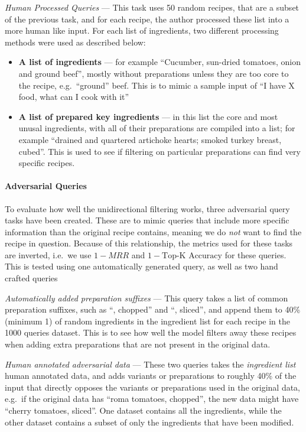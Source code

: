 \documentclass[11pt]{article}
\begin{document}
\emph{Human Processed Queries} --- This task uses 50 random recipes, that
are a subset of the previous task, and for each recipe, the author processed
these list into a more human like input.
For each list of ingredients, two different processing methods were used as
described below:
\begin{itemize}
    \item \textbf{A list of ingredients} --- for example ``Cucumber,
        sun-dried tomatoes, onion and ground beef'', mostly without preparations
        unless they are too core to the recipe, e.g.\ ``ground'' beef.
        This is to mimic a sample input of ``I have X food, what can I cook with it''
    \item \textbf{A list of prepared key ingredients} --- in this list the core
        and most unusal ingredients, with all of their preparations are compiled
        into a list; for example ``drained
        and quartered artichoke hearts; smoked turkey breast, cubed''.
        This is used to see if filtering on particular preparations can find
        very specific recipes.
\end{itemize}

\paragraph{Adversarial Queries} 
To evaluate how well the unidirectional filtering works, three adversarial query
tasks have been created.
These are to mimic queries that include more specific information than the
original recipe contains, meaning we do \emph{not} want to find the recipe in
question.
Because of this relationship, the metrics used for these tasks are inverted,
i.e.\ we use $1-MRR$ and $1-\text{Top-K Accuracy}$ for these queries.
This is tested using one automatically generated query, as well as two hand
crafted queries 

\emph{Automatically added preparation suffixes} --- This query takes a list of
common preparation suffixes, such as ``, chopped'' and ``, sliced'', and append
them to 40\% (minimum 1) of random ingredients in the ingredient list for each
recipe in the 1000 queries dataset.
This is to see how well the model filters away these recipes when adding extra
preparations that are not present in the original data.

\emph{Human annotated adversarial data} --- These two queries takes the
\emph{ingredient list} human annotated data, and adds variants or preparations
to roughly 40\% of the input that directly opposes the variants or preparations
used in the original data, e.g.\ if the original data has ``roma tomatoes,
chopped'', the new data might have ``cherry tomatoes, sliced''.
One dataset contains all the ingredients, while the other dataset contains a
subset of only the ingredients that have been modified.
\end{document}
